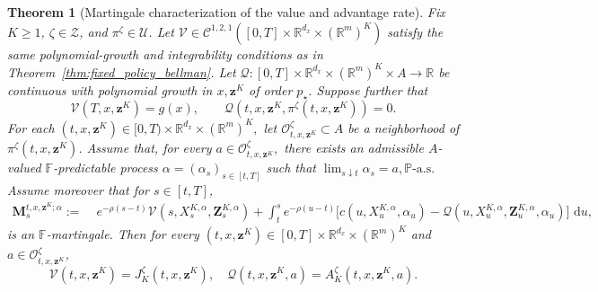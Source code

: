 \documentclass[11pt]{article}
\newtheorem{theorem}{Theorem}[section]
\theoremstyle{remarkitalic}
\theoremstyle{remarkitalic}
\newcommand{\dd}{\,\mathrm d}
\newcommand{\1}{\mathbf 1}
\begin{document}
\begin{theorem}[Martingale characterization of the value and advantage rate]
\label{thm:martingale}
Fix $K\geq1$, $\zeta\in\mathcal Z$, and
$\pi^\zeta\in\mathcal U$. Let
    $\mathcal V
    \in
    \mathcal C^{1,2,1}
    \left(
        [0,T]\times
        \mathbb R^{d_x}\times(\mathbb R^m)^K
    \right)$ satisfy the same polynomial-growth and integrability conditions as in
Theorem~\ref{thm:fixed_policy_bellman}. Let $\mathcal Q:
    [0,T]\times\mathbb R^{d_x}
    \times(\mathbb R^m)^K\times A
    \longrightarrow\mathbb R$
be continuous with polynomial growth in $x,\mathbf z^K$ of order $p_\star$. 
Suppose further that
\begin{equation}
\label{eq:martingale_terminal_normalization}
    \mathcal V(T,x,\mathbf z^K)=g(x),
    \qquad
    \mathcal Q
    \left(
        t,x,\mathbf z^K,
        \pi^\zeta(t,x,\mathbf z^K)
    \right)
    =0.
\end{equation} For each $(t,x,\mathbf z^K)
    \in
    [0,T)\times
    \mathbb R^{d_x}\times(\mathbb R^m)^K,$
let $\mathcal O^\zeta_{t,x,\mathbf z^K}
    \subset A$
be a neighborhood of
$\pi^\zeta(t,x,\mathbf z^K)$. Assume that, for every $a\in\mathcal O^\zeta_{t,x,\mathbf z^K},$ there exists an admissible $A$-valued
$\mathbb F$-predictable process $\alpha=(\alpha_s)_{s\in[t,T]}$
such that
    $\lim_{s\downarrow t}\alpha_s=a,
    \mathbb P\text{-a.s.}$
Assume moreover that for $s\in[t,T]$,
\begin{align}
\label{eq:discounted_martingale_characterization}
    \mathbf M_s^{t,x,\mathbf z^K;\alpha}
    :=\;&
    e^{-\rho(s-t)}
    \mathcal V
    \left(
        s,X_s^{K,\alpha},\mathbf Z_s^{K,\alpha}
    \right)+
    \int_t^s
    e^{-\rho(u-t)}
    \Big[
        c\left(
            u,X_u^{K,\alpha},\alpha_u
        \right)
        -
        \mathcal Q
        \left(
            u,X_u^{K,\alpha},
            \mathbf Z_u^{K,\alpha},
            \alpha_u
        \right)
    \Big]
    \,\dd u,
\end{align}
is an $\mathbb F$-martingale. Then for every $
    (t,x,\mathbf z^K)
    \in
    [0,T]\times
    \mathbb R^{d_x}\times(\mathbb R^m)^K$ and $a\in\mathcal O^\zeta_{t,x,\mathbf z^K}$,\[
    \mathcal V(t,x,\mathbf z^K)
    =
    J_K^\zeta(t,x,\mathbf z^K),\quad
    \mathcal Q(t,x,\mathbf z^K,a)
    =
    A_K^\zeta(t,x,\mathbf z^K,a).
\]

\end{theorem}
\end{document}

